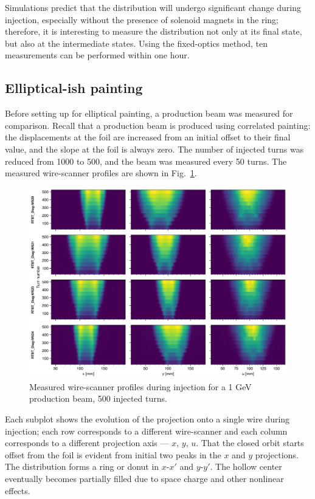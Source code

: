 Simulations predict that the distribution will undergo significant change during injection, especially without the presence of solenoid magnets in the ring; therefore, it is interesting to measure the distribution not only at its final state, but also at the intermediate states. Using the fixed-optics method, ten measurements can be performed within one hour. 

\subsection{Elliptical-ish painting}

Before setting up for elliptical painting, a production beam was measured for comparison. Recall that a production beam is produced using correlated painting: the displacements at the foil are increased from an initial offset to their final value, and the slope at the foil is always zero. The number of injected turns was reduced from 1000 to 500, and the beam was measured every 50 turns. The measured wire-scanner profiles are shown in Fig.~\ref{fig:exp1_waterfall_prod}.
%
\begin{figure}[!p]
    \centering
    \includegraphics[width=\textwidth]{Images/chapter5/exp1_waterfall_prod.png}
    \caption{Measured wire-scanner profiles during injection for a 1 GeV production beam, 500 injected turns.}
    \label{fig:exp1_waterfall_prod}
\end{figure}
%
Each subplot shows the evolution of the projection onto a single wire during injection; each row corresponds to a different wire-scanner and each column corresponds to a different projection axis — $x$, $y$, $u$. That the closed orbit starts offset from the foil is evident from initial two peaks in the $x$ and $y$ projections. The distribution forms a ring or donut in $x$-$x'$ and $y$-$y'$. The hollow center eventually becomes partially filled due to space charge and other nonlinear effects.





